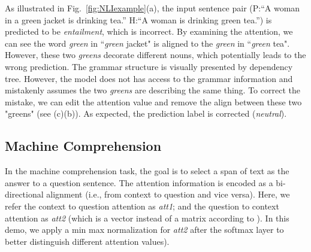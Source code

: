 As illustrated in Fig.~\ref{fig:NLIexample}(a), the input sentence pair (P:``A woman in a green jacket is drinking tea.'' H:``A woman is drinking green tea.'') is predicted to be \emph{entailment}, which is incorrect.
By examining the attention, we can see the word \emph{green} in ``\emph{green} jacket" is aligned to the \emph{green} in ``\emph{green} tea". However, these two \emph{greens} decorate different nouns, which potentially leads to the wrong prediction. The grammar structure is visually presented by dependency tree.
However, the model does not has access to the grammar information and mistakenly assumes the two \emph{greens} are describing the same thing.
%
To correct the mistake, we can edit the attention value and remove the align between these two "greens" (see (c)(b)).
As expected, the prediction label is corrected (\emph{neutral}).

\subsection{Machine Comprehension}
\label{sec:MCexample}
In the machine comprehension task, the goal is to select a span of text as the answer
to a question sentence.
The attention information is encoded as a bi-directional alignment (i.e., from context to question and vice versa). 
Here, we refer the context to question attention as \emph{att1}; and the question to context attention as \emph{att2} (which is a vector instead of a matrix according to \citet{Seo2016}). In this demo, we apply a min max normalization for \emph{att2} after the softmax layer to better distinguish different attention values).

